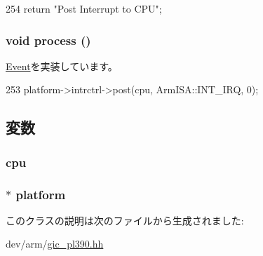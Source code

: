 \begin{DoxyCode}
254 { return "Post Interrupt to CPU"; }
\end{DoxyCode}
\hypertarget{classPl390_1_1PostIntEvent_a2e9c5136d19b1a95fc427e0852deab5c}{
\subsubsection[{process}]{\setlength{\rightskip}{0pt plus 5cm}void process ()}}
\label{classPl390_1_1PostIntEvent_a2e9c5136d19b1a95fc427e0852deab5c}


\hyperlink{classEvent_a142b75b68a6291400e20fb0dd905b1c8}{Event}を実装しています。


\begin{DoxyCode}
253 { platform->intrctrl->post(cpu, ArmISA::INT_IRQ, 0);}
\end{DoxyCode}


\subsection{変数}
\hypertarget{classPl390_1_1PostIntEvent_a5af5cfc775318915ba91bd706254f4db}{
\subsubsection[{cpu}]{ {\bf cpu}}}
\label{classPl390_1_1PostIntEvent_a5af5cfc775318915ba91bd706254f4db}
\hypertarget{classPl390_1_1PostIntEvent_a75b48f1787959a4617f2a599d7c09aab}{
\subsubsection[{platform}]{$\ast$ {\bf platform}}}
\label{classPl390_1_1PostIntEvent_a75b48f1787959a4617f2a599d7c09aab}


このクラスの説明は次のファイルから生成されました:\begin{DoxyCompactItemize}
\item 
dev/arm/\hyperlink{gic__pl390_8hh}{gic\_\-pl390.hh}\end{DoxyCompactItemize}
